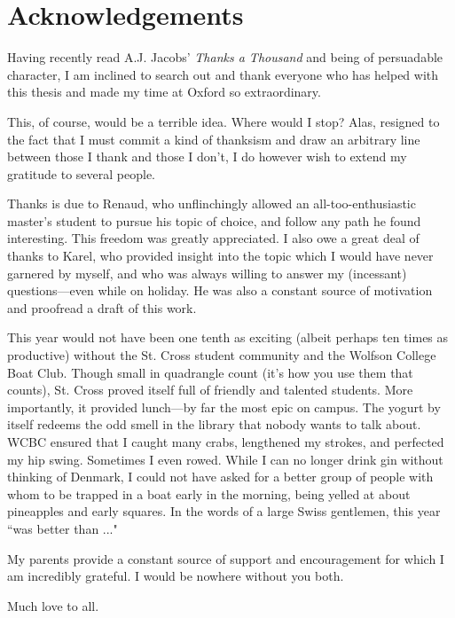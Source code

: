 \chapter*{Acknowledgements}

Having recently read A.J. Jacobs' \emph{Thanks a  Thousand} and  being of persuadable character, I am inclined to search out and thank everyone who has helped with this thesis and made my time at Oxford so extraordinary. 

This, of course, would be a terrible idea. Where would I stop? 
Alas, resigned to the fact  that I must commit a kind of thanksism  and draw  an arbitrary line between those I thank and  those I don't, I do however wish to extend  my gratitude to several  people. 

Thanks is due to Renaud, who unflinchingly allowed an all-too-enthusiastic master's student to pursue his topic of choice, and follow any path  he found interesting. This freedom was  greatly appreciated. I also owe a great  deal of thanks to Karel,  who provided insight into the topic which I would  have never  garnered  by myself, and who  was  always willing to answer my (incessant) questions---even while  on holiday. He was also a constant source  of motivation and  proofread  a draft  of this work. 

This year would not have been one tenth as exciting (albeit perhaps ten times as productive) without the St. Cross student community and the Wolfson College Boat Club. Though small in quadrangle count (it's  how you use them  that counts), St. Cross proved itself  full of friendly and talented students. More importantly, it provided lunch---by far the most  epic on campus. 
The yogurt by itself redeems the odd smell in the library that nobody wants to talk about. 
WCBC ensured that I caught many crabs, lengthened  my strokes, and perfected my hip swing. Sometimes I even rowed. While I  can no longer drink gin  without thinking of Denmark, I could not have  asked for a  better group of people  with whom to be trapped in  a boat early in the morning, being yelled at about pineapples and early squares. In the words of a large Swiss gentlemen, this  year ``was better than ..." 

My parents provide a constant source of support and encouragement for which I am  incredibly  grateful. I  would be nowhere without you both.  

Much love to all. 


